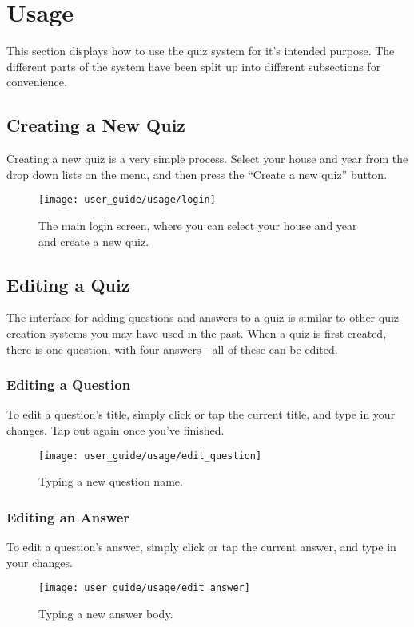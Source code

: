 \section{Usage} %
\label{sec:usage}
This section displays how to use the quiz system for it's intended purpose. The different parts of the system have been split up into different subsections for convenience.

\subsection{Creating a New Quiz} %
\label{sub:creating_a_quiz}
Creating a new quiz is a very simple process. Select your house and year from the drop down lists on the menu, and then press the ``Create a new quiz'' button.
\begin{figure}[h!]
  \centering
  \texttt{[image: user\_guide/usage/login]}
  \caption{The main login screen, where you can select your house and year and create a new quiz.}
\end{figure}

\clearpage

\subsection{Editing a Quiz} %
\label{sub:editing_a_quiz}
The interface for adding questions and answers to a quiz is similar to other quiz creation systems you may have used in the past. When a quiz is first created, there is one question, with four answers - all of these can be edited.

\subsubsection{Editing a Question} %
\label{ssub:editing_a_question}
To edit a question's title, simply click or tap the current title, and type in your changes. Tap out again once you've finished.
\begin{figure}[h!]
  \centering
  \texttt{[image: user\_guide/usage/edit\_question]}
  \caption{Typing a new question name.}
\end{figure}

\clearpage

\subsubsection{Editing an Answer} %
\label{ssub:editing_an_answer}
To edit a question's answer, simply click or tap the current answer, and type in your changes.
\begin{figure}[h!]
  \centering
  \texttt{[image: user\_guide/usage/edit\_answer]}
  \caption{Typing a new answer body.}
\end{figure}


